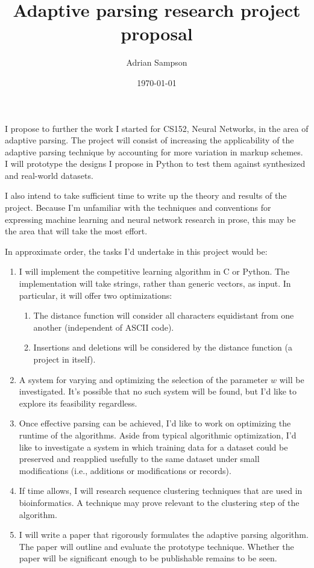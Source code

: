 \documentclass{article}
\title{Adaptive parsing research project proposal}
\author{Adrian Sampson}
\date{\today}
\begin{document}
\maketitle

I propose to further the work I started for CS152, Neural Networks, in the area of adaptive parsing. The project will consist of increasing the applicability of the adaptive parsing technique by accounting for more variation in markup schemes. I will prototype the designs I propose in Python to test them against synthesized and real-world datasets.

I also intend to take sufficient time to write up the theory and results of the project. Because I'm unfamiliar with the techniques and conventions for expressing machine learning and neural network research in prose, this may be the area that will take the most effort.

In approximate order, the tasks I'd undertake in this project would be:

\begin{enumerate}

\item I will implement the competitive learning algorithm in C or Python. The implementation will take strings, rather than generic vectors, as input. In particular, it will offer two optimizations:
\begin{enumerate}
\item The distance function will consider all characters equidistant from one another (independent of ASCII code).
\item Insertions and deletions will be considered by the distance function (a project in itself).
\end{enumerate}

\item A system for varying and optimizing the selection of the parameter $w$ will be investigated. It's possible that no such system will be found, but I'd like to explore its feasibility regardless.

\item Once effective parsing can be achieved, I'd like to work on optimizing the runtime of the algorithms. Aside from typical algorithmic optimization, I'd like to investigate a system in which training data for a dataset could be preserved and reapplied usefully to the same dataset under small modifications (i.e., additions or modifications or records).

\item If time allows, I will research sequence clustering techniques that are used in bioinformatics. A technique may prove relevant to the clustering step of the algorithm.

\item I will write a paper that rigorously formulates the adaptive parsing algorithm. The paper will outline and evaluate the prototype technique. Whether the paper will be significant enough to be publishable remains to be seen.

\end{enumerate}
\end{document}
